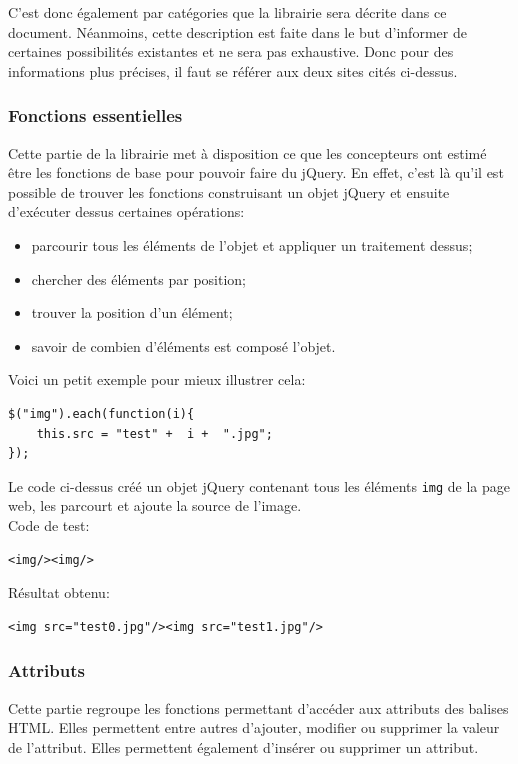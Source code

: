 \documentclass[10pt,a4paper,titlepage]{article}
\begin{document}
C'est donc également par catégories que la librairie sera décrite dans ce document. Néanmoins, cette description est faite dans le but d'informer de certaines possibilités existantes et ne sera pas exhaustive. Donc pour des informations plus précises, il faut se référer aux deux sites cités ci-dessus.

\subsubsection{Fonctions essentielles}
Cette partie de la librairie met à disposition ce que les concepteurs ont estimé être les fonctions de base pour pouvoir faire du jQuery. En effet, c'est là qu'il est possible de trouver les fonctions construisant un objet jQuery et ensuite d'exécuter dessus certaines opérations:

\begin{itemize}
	\item parcourir tous les éléments de l'objet et appliquer un traitement dessus;
	\item chercher des éléments par position;
	\item trouver la position d'un élément;
	\item savoir de combien d'éléments est composé l'objet.\\
\end{itemize}

Voici un petit exemple pour mieux illustrer cela:

\begin{lstlisting}
$("img").each(function(i){
	this.src = "test" +  i +  ".jpg";
});
\end{lstlisting}

Le code ci-dessus créé un objet jQuery contenant tous les éléments \texttt{img} de la page web, les parcourt et ajoute la source de l'image.\\

Code de test:
\begin{lstlisting}
<img/><img/>
\end{lstlisting}


Résultat obtenu:
\begin{lstlisting}
<img src="test0.jpg"/><img src="test1.jpg"/>
\end{lstlisting}

\subsubsection{Attributs}
Cette partie regroupe les fonctions permettant d'accéder aux attributs des balises HTML. Elles permettent entre autres d'ajouter, modifier ou supprimer la valeur de l'attribut. Elles permettent également d'insérer ou supprimer un attribut.\\
\end{document}
